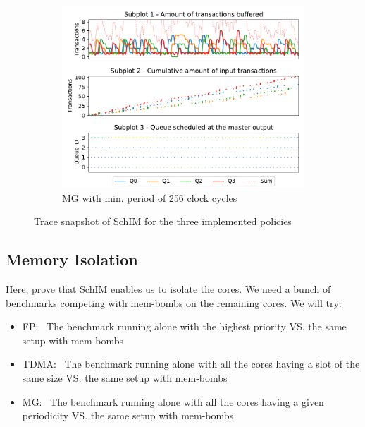 \begin{figure}
\begin{subfigure}{0.5\textwidth}
      \end{subfigure}
      \begin{subfigure}{0.5\textwidth}
        \centering
        \includegraphics[scale=0.55]{images/SchIM_MG_buffering.pdf}
        \caption{MG with min. period of 256 clock cycles}
        \label{fig:schim_behaviour_mg}
      \end{subfigure}
      \caption{Trace snapshot of SchIM for the three implemented policies}
      \label{fig:schim_behaviour}
    \end{figure}

  \subsection{Memory Isolation}
    Here, prove that SchIM enables us to isolate the cores. We need a bunch of benchmarks competing with mem-bombs on the remaining cores. We will try:
    \begin{itemize}
      \item FP:~ The benchmark running alone with the highest priority VS. the same setup with mem-bombs
      \item TDMA:~ The benchmark running alone with all the cores having a slot of the same size VS. the same setup with mem-bombs
      \item MG:~ The benchmark running alone with all the cores having a given periodicity VS. the same setup with mem-bombs
    \end{itemize}
